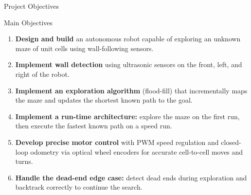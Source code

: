 \documentclass[aspectratio=169,11pt]{beamer}
\newcommand{\highlight}[1]{\textcolor{teal!80!black}{\textbf{#1}}}
\begin{document}
\begin{frame}{Project Objectives}
    \begin{block}{Main Objectives}
        \begin{enumerate}
            \item \highlight{Design and build} an autonomous robot capable of exploring an unknown maze of unit cells using wall-following sensors.
            \item \highlight{Implement wall detection} using ultrasonic sensors on the front, left, and right of the robot.
            \item \highlight{Implement an exploration algorithm} (flood-fill) that incrementally maps the maze and updates the shortest known path to the goal.
            \item \highlight{Implement a run-time architecture:} explore the maze on the first run, then execute the fastest known path on a speed run.
            \item \highlight{Develop precise motor control} with PWM speed regulation and closed-loop odometry via optical wheel encoders for accurate cell-to-cell moves and turns.
            \item \highlight{Handle the dead-end edge case:} detect dead ends during exploration and backtrack correctly to continue the search.
        \end{enumerate}
    \end{block}
\end{frame}

\end{document}
